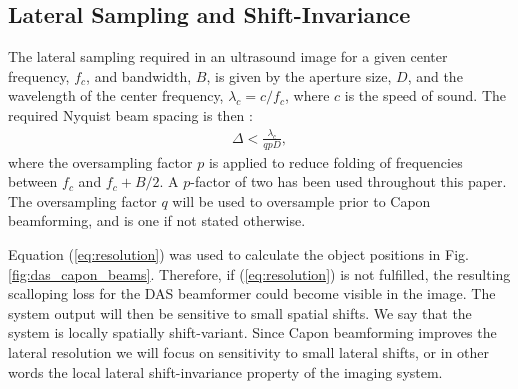 \documentclass[journal]{IEEEtran}
\newcommand{\mat}[1]{\mathbf{#1}}
\renewcommand{\vec}[1]{\mathbf{#1}}
\begin{document}

\subsection{Lateral Sampling and Shift-Invariance}

The lateral sampling required in an ultrasound image for a given center frequency, $f_c$, and bandwidth, $B$, is given by the aperture size, $D$, and the wavelength of the center frequency, $\lambda_c = c/f_c$, where $c$ is the speed of sound. The required Nyquist beam spacing is then \cite{Hergum2007}:
\begin{align}
\Delta < \frac{\lambda_c}{qpD}, \label{eq:resolution}
\end{align}
where the oversampling factor $p$ is applied to reduce folding of frequencies between $f_c$ and $f_c + B/2$. A $p$-factor of two has been used throughout this paper. The oversampling factor $q$ will be used to oversample prior to Capon beamforming, and is one if not stated otherwise. 

Equation (\ref{eq:resolution}) was used to calculate the object positions in Fig.\,\ref{fig:das_capon_beams}. Therefore, if (\ref{eq:resolution}) is not fulfilled, the resulting scalloping loss for the DAS beamformer could become visible in the image. The system output will then be sensitive to small spatial shifts. We say that the system is locally spatially shift-variant. Since Capon beamforming improves the lateral resolution we will focus on sensitivity to small lateral shifts, or in other words the local lateral shift-invariance property of the imaging system.%
\end{document}
